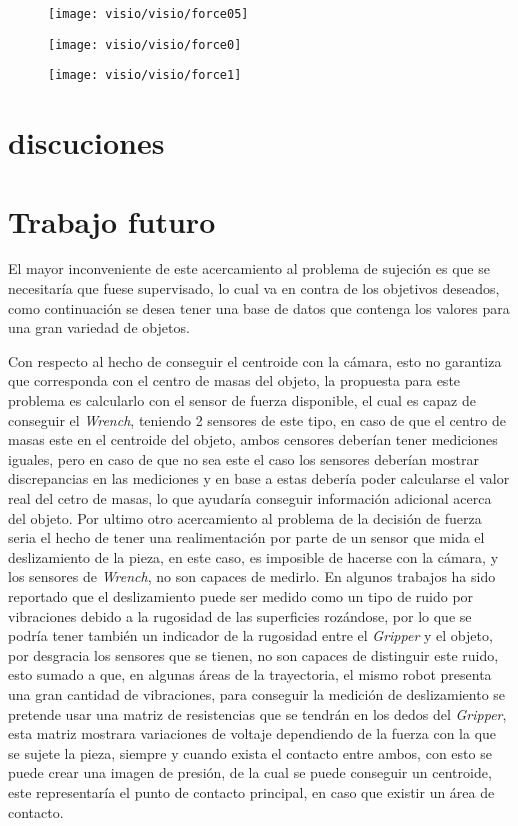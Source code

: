 \begin{figure}[h]
	\centering
	\texttt{[image: visio/visio/force05]}
	\label{fig:force0}
\end{figure}
\begin{figure}[h]
	\centering
	\texttt{[image: visio/visio/force0]}
	\label{fig:force05}
\end{figure}
\begin{figure}[h]
	\centering
	\texttt{[image: visio/visio/force1]}
	\caption{}
	\label{fig:force1}
\end{figure}

\section{discuciones}





\section{Trabajo futuro}

El mayor inconveniente de este acercamiento al problema de sujeción es que se necesitaría que fuese supervisado, lo cual va en contra de los objetivos deseados, como continuación se desea tener una base de datos que contenga los valores para una gran variedad de objetos.


Con respecto al hecho de conseguir el centroide con la cámara, esto no garantiza que corresponda con el centro de masas del objeto, la propuesta para este problema es calcularlo con el sensor de fuerza disponible, el cual es capaz de conseguir el \textit{Wrench}, teniendo 2 sensores de este tipo, en caso de que el centro de masas este en el centroide del objeto, ambos censores deberían tener mediciones iguales, pero en caso de que no sea este el caso los sensores deberían mostrar discrepancias en las mediciones y en base a estas debería poder calcularse el valor real del cetro de masas, lo que ayudaría conseguir información adicional acerca del objeto.
Por ultimo otro acercamiento al problema de la decisión de fuerza seria el hecho de tener una realimentación por parte de un sensor que mida el deslizamiento de la pieza, en este caso, es imposible de hacerse con la cámara, y los sensores de \textit{Wrench}, no son capaces de medirlo. En algunos trabajos ha sido reportado que el deslizamiento puede ser medido como un tipo de ruido por vibraciones debido a la rugosidad de las superficies rozándose, por lo que se podría tener también un indicador de la rugosidad entre el \textit{Gripper} y el objeto, por desgracia los sensores que se tienen, no son capaces de distinguir este ruido, esto sumado a que, en algunas áreas de la trayectoria, el mismo robot presenta una gran cantidad de vibraciones, para conseguir la medición de deslizamiento se pretende usar una matriz de resistencias que se tendrán en los dedos del \textit{Gripper}, esta matriz mostrara variaciones de voltaje dependiendo de la fuerza con la que se sujete la pieza, siempre y cuando exista el contacto entre ambos, con esto se puede crear una imagen de presión, de la cual se puede conseguir un centroide, este representaría el punto de contacto principal, en caso que existir un área de contacto. 
